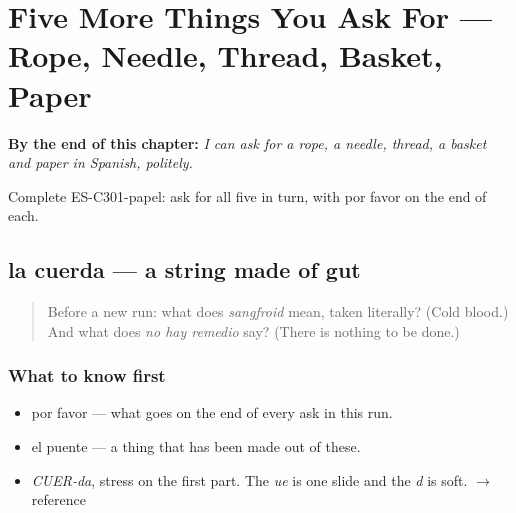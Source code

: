 
\chapter{Five More Things You Ask For --- Rope, Needle, Thread, Basket, Paper}
\label{ch:mas-cosas-que-pedir}

\begin{chapteropening}
\textbf{By the end of this chapter:} \emph{I can ask for a rope, a needle, thread, a basket and paper in Spanish, politely.}

Complete ES-C301-papel: ask for all five in turn, with por favor on the end of each.
\end{chapteropening}

\section[la cuerda]{la cuerda — a string made of gut}

\label{lesson:ES-C301-cuerda}



\begin{quote}
Before a new run: what does \emph{sangfroid} mean, taken literally? (Cold blood.) And what does \emph{no hay remedio} say? (There is nothing to be done.)
\end{quote}

\subsection*{What to know first}
\begin{itemize}
\raggedright
  \item por favor — what goes on the end of every ask in this run.
  \item el puente — a thing that has been made out of these.
\end{itemize}

\begin{sounds}
\begin{itemize}
\raggedright
  \item \emph{CUER-da}, stress on the first part. The \emph{ue} is one slide and the \emph{d} is soft. $\to$ reference
\end{itemize}
\end{sounds}

